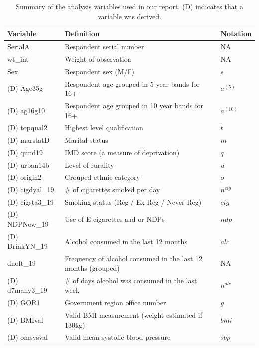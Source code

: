 \documentclass[
  11pt,
  twocolumn]{article}
\begin{document}
\begin{table}
\centering
\caption{\label{tab:outputvartable}Summary of the analysis variables used in our report. (D) indicates that a variable was derived.\label{tab:output-var-table}}
\centering
\fontsize{10}{12}\selectfont
\begin{tabular}[t]{>{\raggedright\arraybackslash}p{6em}|>{\raggedright\arraybackslash}p{10em}|l}
\hline
\textbf{Variable} & \textbf{Definition} & \textbf{Notation}\\
\hline
SerialA & Respondent serial number & NA\\
\hline
wt\_int & Weight of observation & NA\\
\hline
Sex & Respondent sex (M/F) & $s$\\
\hline
(D) Age35g & Respondent age grouped in 5 year bands for 16+ & $a^{(5)}$\\
\hline
(D) ag16g10 & Respondent age grouped in 10 year bands for 16+ & $a^{(10)}$\\
\hline
(D) topqual2 & Highest level qualification & $t$\\
\hline
(D) marstatD & Marital status & $m$\\
\hline
(D) qimd19 & IMD score (a measure of deprivation) & $q$\\
\hline
(D) urban14b & Level of rurality & $u$\\
\hline
(D) origin2 & Grouped ethnic category & $o$\\
\hline
(D) cigdyal\_19 & $\#$ of cigarettes smoked per day & $n^{cig}$\\
\hline
(D) cigsta3\_19 & Smoking status (Reg / Ex-Reg / Never-Reg) & $cig$\\
\hline
(D) NDPNow\_19 & Use of E-cigarettes and or NDPs & $ndp$\\
\hline
(D) DrinkYN\_19 & Alcohol consumed in the last 12 months & $alc$\\
\hline
dnoft\_19 & Frequency of alcohol consumed in the last 12 months (grouped) & NA\\
\hline
(D) d7many3\_19 & $\#$ of days alcohol was consumed in the last week & $n^{alc}$\\
\hline
(D) GOR1 & Government region office number & $g$\\
\hline
(D) BMIval & Valid BMI measurement (weight estimated if $\>$ 130kg) & $bmi$\\
\hline
(D) omsysval & Valid mean systolic blood pressure & $sbp$\\
\hline
\end{tabular}
\end{table}
\end{document}

